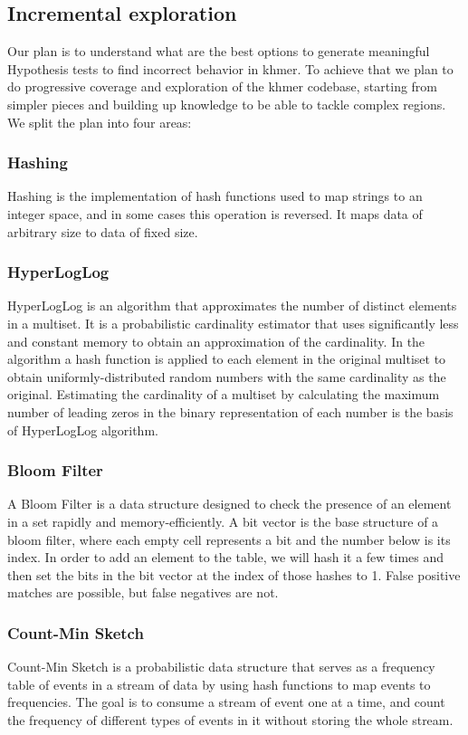 \documentclass[preprint,nocopyrightspace]{sig-alternate}
\begin{document}
\subsection{Incremental exploration}
Our plan is to understand what are the best options to generate meaningful Hypothesis tests to find incorrect behavior in khmer.
To achieve that we plan to do progressive coverage and exploration of the khmer codebase,
starting from simpler pieces and building up knowledge to be able to tackle complex regions.
We split the plan into four areas:

\subsubsection{Hashing}
Hashing is the implementation of hash functions used to map strings to an integer space,
and in some cases this operation is reversed.
It maps data of arbitrary size to data of fixed size.

\subsubsection{HyperLogLog}
HyperLogLog is an algorithm that approximates the number of distinct elements in a multiset.
It is a probabilistic cardinality estimator that uses significantly less and constant memory to obtain an approximation of the cardinality.
In the algorithm a hash function is applied to each element in the original multiset to obtain uniformly-distributed random numbers with the same cardinality as the original.
Estimating the cardinality of a multiset by calculating the maximum number of leading zeros in the binary representation of each number is the basis of HyperLogLog algorithm.

\subsubsection{Bloom Filter}
A Bloom Filter is a data structure designed to check the presence of an element in a set rapidly and memory-efficiently.
A bit vector is the base structure of a bloom filter,
where each empty cell represents a bit and the number below is its index.
In order to add an element to the table,
we will hash it a few times and then set the bits in the bit vector at the index of those hashes to 1.
False positive matches are possible,
but false negatives are not.

\subsubsection{Count-Min Sketch}
Count-Min Sketch is a probabilistic data structure that serves as a frequency table of events in a stream of data by using hash functions to map events to frequencies.
The goal is to consume a stream of event one at a time,
and count the frequency of different types of events in it without storing the whole stream.
\end{document}

